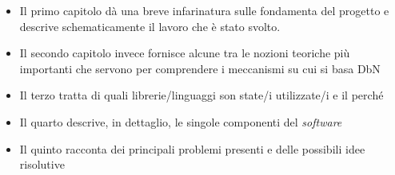 \begin{itemize}
	\item Il primo capitolo dà una breve infarinatura sulle fondamenta del progetto e descrive schematicamente il lavoro che è stato svolto.
	\item Il secondo capitolo invece fornisce alcune tra le nozioni teoriche più importanti che
	servono per comprendere i meccanismi su cui si basa DbN
	\item Il terzo tratta di quali librerie/linguaggi son state/i utilizzate/i e il perché
	\item Il quarto descrive, in dettaglio, le singole componenti del \textit{software}
	\item Il quinto racconta dei principali problemi presenti e delle possibili idee risolutive
\end{itemize}